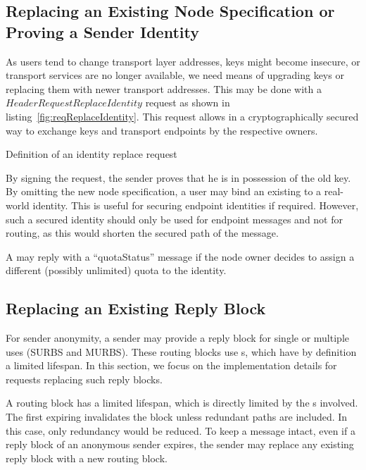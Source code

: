 \subsection{Replacing an Existing Node Specification or Proving a Sender Identity\label{sec:replaceID}}
As users tend to change transport layer addresses, keys might become insecure, or transport services are no longer available, we need means of upgrading keys or replacing them with newer transport addresses. This may be done with a $HeaderRequestReplaceIdentity$ request as shown in listing~\ref{fig:reqReplaceIdentity}. This request allows in a cryptographically secured way to exchange keys and transport endpoints by the respective owners.

\begin{lstfloat}[ht]
	
	\caption{Definition of an identity replace request}
	\label{fig:reqReplaceIdentity}
\end{lstfloat}

By signing the request, the sender proves that he is in possession of the old key. By omitting the new node specification, a user may bind an existing  to a real-world identity. This is useful for securing endpoint identities if required. However, such a secured identity should only be used for endpoint messages and not for routing, as this would shorten the secured path of the message.

A \VortexNode{} may reply with a ``quotaStatus'' message if the node owner decides to assign a different (possibly unlimited) quota to the identity. 

\subsection{Replacing an Existing Reply Block\label{sec:replaceMURB}}
For sender anonymity, a sender may provide a reply block for single or multiple uses (SURBS and MURBS). These routing blocks use s, which have by definition a limited lifespan. In this section, we focus on the implementation details for requests replacing such reply blocks.

A routing block has a limited lifespan, which is directly limited by the s involved. The first expiring  invalidates the block unless redundant paths are included. In this case, only redundancy would be reduced. To keep a message intact, even if a reply block of an anonymous sender expires, the sender may replace any existing reply block with a new routing block.

